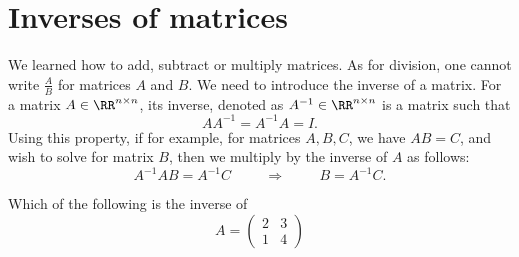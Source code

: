 \documentclass{ximera}
\begin{document}
\section{Inverses of matrices}


We learned how to add, subtract or multiply matrices. As for division,
one cannot write $\frac{A}{B}$ for matrices $A$ and $B$. We need to
introduce the inverse of a matrix. For a matrix $A \in \RR^{n\times n}$, its
inverse, denoted as $A^{-1} \in \RR^{n\times n}$ is a matrix such that
\begin{equation}\label{inverse}
AA^{-1}= A^{-1}A = I.
\end{equation}
Using this property, if for example, for matrices $A, B, C$, we have $AB = C$, and wish to solve for matrix $B$, then we multiply by the inverse of $A$ as follows:
\begin{equation*}
A^{-1}AB= A^{-1}C \hspace{1cm} \Rightarrow \hspace{1cm} B = A^{-1}C.
\end{equation*}

\begin{question}
  Which of the following is the inverse of
  \begin{equation*}
    A= \left(
      \begin{array}{cc}
        2 & 3   \\
        1 &  4
      \end{array}
    \right)
  \end{equation*}
  \begin{multipleChoice}
    \pdfOnly{\end{multicols}}
  \end{multipleChoice}
\end{question}
\end{document}

